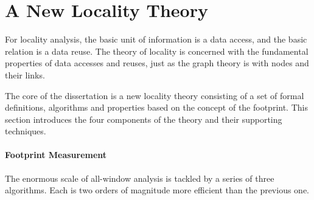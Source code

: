 \section{A New Locality Theory}
\label{sec:intro:theory}

For locality analysis, the basic unit of information is a data access,
and the basic relation is a data reuse.  The theory of locality is
concerned with the fundamental properties of data accesses and reuses,
just as the graph theory is with nodes and their links.

The core of the dissertation is a new locality theory consisting of a
set of formal definitions, algorithms and properties based on the
concept of the footprint.  This section introduces the four components of the theory and their supporting techniques.

\paragraph{Footprint Measurement}
The enormous scale of all-window analysis is tackled by a series of
three algorithms.  Each is two orders of magnitude more efficient than
the previous one.

